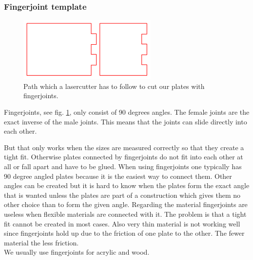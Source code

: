 \documentclass[../ClassicThesis.tex]{subfiles}
\begin{document}
\subsubsection{Fingerjoint template}

\begin{figure}[!ht]
\centering
\includegraphics[width=.5\columnwidth]{Images/fingerjoints.png}
\caption{Path which a lasercutter has to follow to cut our plates with fingerjoints.}
\label{fig:fingerjoints}
\end{figure}


Fingerjoints, see fig. \ref{fig:fingerjoints}, only consist of 90 degrees angles. The female joints are the exact inverse of the male joints. This means that the joints can slide directly into each other. 

But that only works when the sizes are measured correctly so that they create a tight fit. Otherwise plates connected by fingerjoints do not fit into each other at all or fall apart and have to be glued. 
When using fingerjoints one typically has 90 degree angled plates because it is the easiest way to connect them. Other angles can be created but it is hard to know when the plates form the exact angle that is wanted unless the plates are part of a construction which gives them no other choice than to form the given angle.
Regarding the material fingerjoints are useless when flexible materials are connected with it. The problem is that a tight fit cannot be created in most cases. Also very thin material is not working well since fingerjoints hold up due to the friction of one plate to the other. The fewer material the less friction.\\
We usually use fingerjoints for acrylic and wood.
\end{document}
